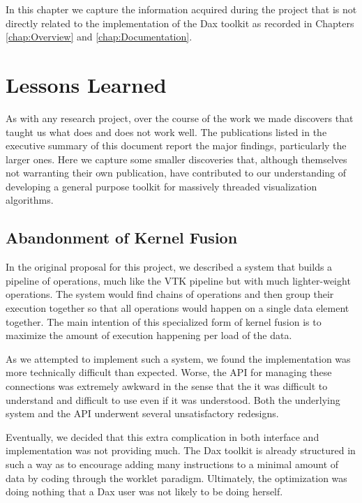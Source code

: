 
In this chapter we capture the information acquired during the project that
is not directly related to the implementation of the Dax toolkit as
recorded in Chapters \ref{chap:Overview} and \ref{chap:Documentation}.

\section{Lessons Learned}

As with any research project, over the course of the work we made
discovers that taught us what does and does not work well. The publications
listed in the executive summary of this document report the major findings,
particularly the larger ones. Here we capture some smaller discoveries
that, although themselves not warranting their own publication, have
contributed to our understanding of developing a general purpose toolkit
for massively threaded visualization algorithms.

\subsection{Abandonment of Kernel Fusion}

In the original proposal for this project, we described a system that
builds a pipeline of operations, much like the VTK pipeline but with much
lighter-weight operations. The system would find chains of operations and
then group their execution together so that all operations would happen on
a single data element together. The main intention of this specialized form
of kernel fusion is to maximize the amount of execution happening per load
of the data.

As we attempted to implement such a system, we found the implementation was
more technically difficult than expected. Worse, the API for managing these
connections was extremely awkward in the sense that the it was difficult to
understand and difficult to use even if it was understood. Both the
underlying system and the API underwent several unsatisfactory redesigns.

Eventually, we decided that this extra complication in both interface and
implementation was not providing much. The Dax toolkit is already
structured in such a way as to encourage adding many instructions to a
minimal amount of data by coding through the worklet paradigm. Ultimately,
the optimization was doing nothing that a Dax user was not likely to be
doing herself.

